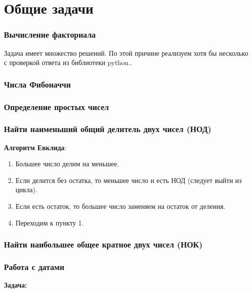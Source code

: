 \part{Общие задачи}

	\section{Вычисление факториала \label{tasks:fac}}
	Задача имеет множество решений. По этой причине реализуем хотя бы несколько с проверкой ответа из библиотеки python..
	
\linenumbers
{}
\nolinenumbers

	\section{Числа Фибоначчи \label{tasks:fib}}
	
	\section{Определение простых чисел \label{tasks:simple} }
	
\linenumbers
{}
\nolinenumbers
	
	\section{Найти наименьший общий делитель двух чисел (НОД)}
	\textbf{Алгоритм Евклида}:
	\begin{enumerate}
\item Большее число делим на меньшее.
\item Если делится без остатка, то меньшее число и есть НОД (следует выйти из цикла).
\item Если есть остаток, то большее число заменяем на остаток от деления.
\item Переходим к пункту 1.

	\end{enumerate}
	
	\section{Найти наибольшее общее кратное двух чисел (НОК)}
	
	\section{Работа с датами}
	\textbf{Задача:}
	

